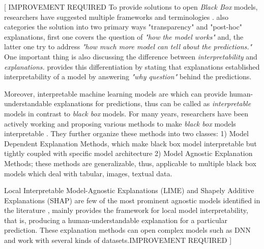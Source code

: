 \documentclass[english]{tktltiki2}
\theoremstyle{definition}
\theoremstyle{remark}
\begin{document}
[ IMPROVEMENT REQUIRED To provide solutions to open {\itshape Black Box} models, researchers have suggested multiple frameworks and terminologies \citep{guidotti2018survey}.  \citep{lipton2016mythos} also categories the solution into two primary ways "transparency" and "post-hoc" explanations, first one covers the question of {\itshape "how the model works"} and, the latter one try to address {\itshape "how much more model can tell about the predictions."} 
One important thing is also discussing the difference between {\itshape interpretability } and {\itshape explanations.} \citep{honegger2018shedding} provides this differentiation by stating that explanations established interpretability of a model by answering {\itshape "why question" } behind the predictions.

Moreover, interpretable machine learning models are which can provide human-understandable explanations for predictions, thus can be called as {\itshape interpretable } models in contrast to {\itshape black box} models. \newline
For many years, researchers have been actively working and proposing various methods to make {\itshape black box } models interpretable \citep{guidotti2018survey}. They further organize these methods into two classes: 1) Model Dependent Explanation Methods, which make black box model interpretable but tightly coupled with specific model architecture 2) Model Agnostic Explanation Methods; these methods are generalizable, thus, applicable to multiple black box models which deal with tabular, images, textual data.

Local Interpretable Model-Agnostic Explanations (LIME) \citep{ribeiro2016should} and Shapely Additive Explanations (SHAP) \citep{lundberg2017unified} are few of the most prominent agnostic models identified in the literature \citep{guidotti2018survey,honegger2018shedding}, mainly provides the framework for local model interpretability, that is, producing a human-understandable explanation for a particular prediction. These explanation methods can open complex models such as DNN and work with several kinds of datasets.\newline IMPROVEMENT REQUIRED ]

%
\end{document}
